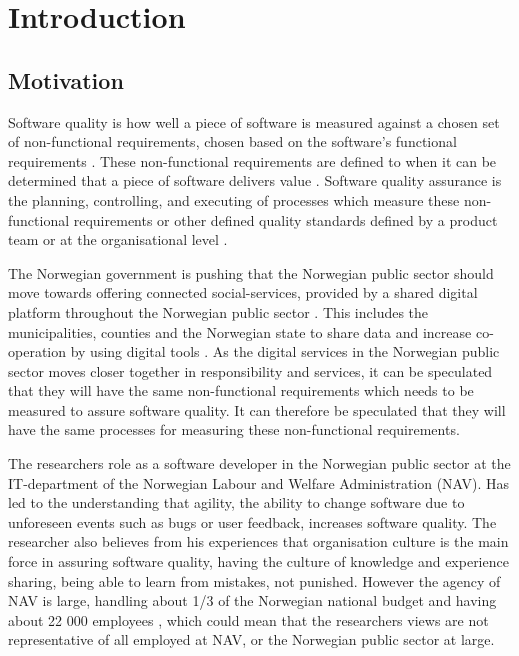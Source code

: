 \chapter{Introduction}

\section{Motivation} \label{sec:motivation}

Software quality is how well a piece of software is measured against a chosen set of non-functional requirements, chosen based on the software's functional requirements \cite{iso_25010:2011}. These non-functional requirements are defined to when it can be determined that a piece of software delivers value \cite{iso_25010:2011}. Software quality assurance is the planning, controlling, and executing of processes which measure these non-functional requirements or other defined quality standards defined by a product team or at the organisational level \cite{ieee_730_2014}\cite{sqa_wiki_2023}. 



The Norwegian government is pushing that the Norwegian public sector should move towards offering connected social-services, provided by a shared digital platform throughout the Norwegian public sector \cite{r_2019}. This includes the municipalities, counties and the Norwegian state to share data and increase co-operation by using digital tools \cite{r_2019}. As the digital services in the Norwegian public sector moves closer together in responsibility and services, it can be speculated that they will have the same non-functional requirements which needs to be measured to assure software quality. It can therefore be speculated that they will have the same processes for measuring these non-functional requirements.

The researchers role as a software developer in the Norwegian public sector at the IT-department of the Norwegian Labour and Welfare Administration (NAV). Has led to the understanding that agility, the ability to change software due to unforeseen events such as bugs or user feedback, increases software quality. The researcher also believes from his experiences that organisation culture is the main force in assuring software quality, having the culture of knowledge and experience sharing, being able to learn from mistakes, not punished. However the agency of NAV is large, handling about 1/3 of the Norwegian national budget \cite{okp_nav_r_2022}\cite{bud_r_2021} and having about 22 000 employees \cite{org_nav_2023}, which could mean that the researchers views are not representative of all employed at NAV, or the Norwegian public sector at large.

